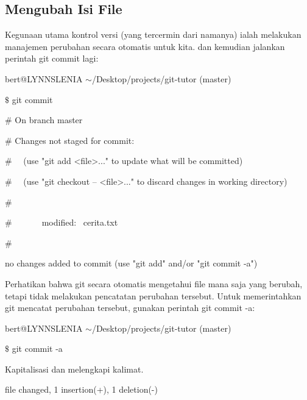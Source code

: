 \subsection{ Mengubah Isi File} \par
\hspace*{0.50in}Kegunaan utama kontrol versi (yang tercermin dari namanya) ialah melakukan manajemen perubahan secara otomatis untuk kita. dan kemudian jalankan perintah git commit lagi: \par
{\fontsize{10pt}{10pt}\selectfont bert@LYNNSLENIA  $  \sim  $/Desktop/projects/git-tutor (master)} \par
{\fontsize{10pt}{10pt}\selectfont  $  \$  $ git commit} \par
{\fontsize{10pt}{10pt}\selectfont  $  \#  $ On branch master} \par
{\fontsize{10pt}{10pt}\selectfont  $  \#  $ Changes not staged for commit:} \par
{\fontsize{10pt}{10pt}\selectfont  $  \#  $~~ (use "git add <file>..." to update what will be committed)} \par
{\fontsize{10pt}{10pt}\selectfont  $  \#  $~~ (use "git checkout -- <file>..." to discard changes in working directory)} \par
{\fontsize{10pt}{10pt}\selectfont  $  \#  $} \par
{\fontsize{10pt}{10pt}\selectfont  $  \#  $~~~~~~~modified:~  cerita.txt} \par
{\fontsize{10pt}{10pt}\selectfont  $  \#  $} \par
{\fontsize{10pt}{10pt}\selectfont no changes added to commit (use "git add" and/or "git commit -a")} \par
\vspace{12pt}
\hspace*{0.50in}Perhatikan bahwa git secara otomatis mengetahui file mana saja yang berubah, tetapi tidak melakukan pencatatan perubahan tersebut. Untuk memerintahkan git mencatat perubahan tersebut, gunakan perintah git commit -a: \par
{\fontsize{10pt}{10pt}\selectfont bert@LYNNSLENIA  $  \sim  $/Desktop/projects/git-tutor (master)} \par
{\fontsize{10pt}{10pt}\selectfont  $  \$  $ git commit -a} \par
{\fontsize{10pt}{10pt}\selectfont [master 61c4707] Kapitalisasi dan melengkapi kalimat.} \par
{\fontsize{10pt}{10pt} file changed, 1 insertion(+), 1 deletion(-)} \par
